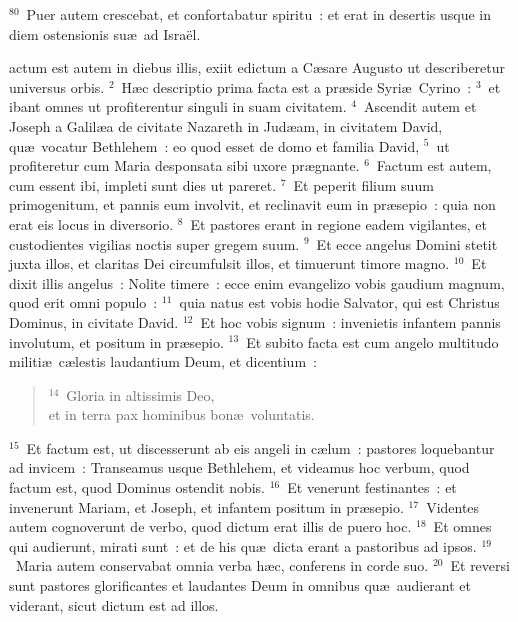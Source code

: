 ${}^{80}$~Puer autem crescebat, et confortabatur spiritu~: et erat in desertis usque in diem ostensionis su\ae\ ad Isra\"el.

\bchapter
{}actum est autem in diebus illis, exiit edictum a C\ae sare Augusto ut describeretur universus orbis.
${}^{2}$~H\ae c descriptio prima facta est a pr\ae side Syri\ae\ Cyrino~:
${}^{3}$~et ibant omnes ut profiterentur singuli in suam civitatem.
${}^{4}$~Ascendit autem et Joseph a Galil\ae a de civitate Nazareth in Jud\ae am, in civitatem David, qu\ae\ vocatur Bethlehem~: eo quod esset de domo et familia David,
${}^{5}$~ut profiteretur cum Maria desponsata sibi uxore pr\ae gnante.
${}^{6}$~Factum est autem, cum essent ibi, impleti sunt dies ut pareret.
${}^{7}$~Et peperit filium suum primogenitum, et pannis eum involvit, et reclinavit eum in pr\ae sepio~: quia non erat eis locus in diversorio.
${}^{8}$~Et pastores erant in regione eadem vigilantes, et custodientes vigilias noctis super gregem suum.
${}^{9}$~Et ecce angelus Domini stetit juxta illos, et claritas Dei circumfulsit illos, et timuerunt timore magno.
${}^{10}$~Et dixit illis angelus~: Nolite timere~: ecce enim evangelizo vobis gaudium magnum, quod erit omni populo~:
${}^{11}$~quia natus est vobis hodie Salvator, qui est Christus Dominus, in civitate David.
${}^{12}$~Et hoc vobis signum~: invenietis infantem pannis involutum, et positum in pr\ae sepio.
${}^{13}$~Et subito facta est cum angelo multitudo militi\ae\ c\ae lestis laudantium Deum, et dicentium~:
\begin{flushleft}\begin{verse}${}^{14}$~Gloria in altissimis Deo,\\ et in terra pax hominibus bon\ae\ voluntatis.\end{verse}\end{flushleft}


${}^{15}$~Et factum est, ut discesserunt ab eis angeli in c\ae lum~: pastores loquebantur ad invicem~: Transeamus usque Bethlehem, et videamus hoc verbum, quod factum est, quod Dominus ostendit nobis.
${}^{16}$~Et venerunt festinantes~: et invenerunt Mariam, et Joseph, et infantem positum in pr\ae sepio.
${}^{17}$~Videntes autem cognoverunt de verbo, quod dictum erat illis de puero hoc.
${}^{18}$~Et omnes qui audierunt, mirati sunt~: et de his qu\ae\ dicta erant a pastoribus ad ipsos.
${}^{19}$~Maria autem conservabat omnia verba h\ae c, conferens in corde suo.
${}^{20}$~Et reversi sunt pastores glorificantes et laudantes Deum in omnibus qu\ae\ audierant et viderant, sicut dictum est ad illos.


